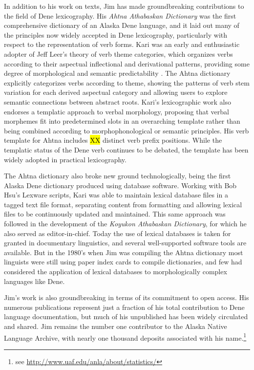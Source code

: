 In addition to his work on texts, Jim has made groundbreaking contributions to the field of Dene lexicography. His \textit{Ahtna Athabaskan Dictionary} \nocite{kari1990} was the first comprehensive dictionary of an Alaska Dene language, and it laid out many of the principles now widely accepted in Dene lexicography, particularly with respect to the representation of verb forms. Kari was an early and enthusiastic adopter of Jeff Leer's theory of verb theme categories, which organizes verbs according to their aspectual inflectional and derivational patterns, providing some degree of morphological and semantic predictability \citep{kari1979}. The Ahtna dictionary explicitly categorizes verbs according to theme, showing the patterns of verb stem variation for each derived aspectual category and allowing users to explore semantic connections between abstract roots. Kari's lexicographic work also endorses a templatic approach to verbal morphology, proposing that verbal morphemes fit into predetermined slots in an overarching template rather than being combined according to morphophonological or semantic principles. His verb template for Ahtna includes \hl{XX} distinct verb prefix positions. While the templatic status of the Dene verb continues to be debated, the template has been widely adopted in practical lexicography.

The Ahtna dictionary also broke new ground technologically, being the first Alaska Dene dictionary produced using database software. Working with Bob Hsu's Lexware scripts, Kari was able to maintain lexical database files in a tagged text file format, separating content from formatting and allowing lexical files to be continuously updated and maintained. This same approach was followed in the development of the \textit{Koyukon Athabaskan Dictionary}, for which he also served as editor-in-chief\nocite{jette2000}. Today the use of lexical databases is taken for granted in documentary linguistics, and several well-supported software tools are available. But in the 1980’s when Jim was compiling the Ahtna dictionary most linguists were still using paper index cards to compile dictionaries, and few had considered the application of lexical databases to morphologically complex languages like Dene.

Jim's work is also groundbreaking in terms of its commitment to open access. His numerous publications represent just a fraction of his total contribution to Dene language documentation, but much of his unpublished has been widely circulated and shared. Jim remains the number one contributor to the Alaska Native Language Archive, with nearly one thousand deposits associated with his name.\footnote{see \url{http://www.uaf.edu/anla/about/statistics/}}


